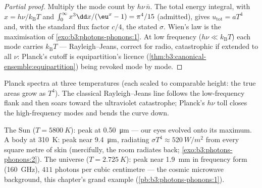 \begin{proof}[Partial proof]
Multiply the mode count by $h\nu\,\bar n$. The total energy
integral, with $x = h\nu/k_{\text{B}}T$ and $\int_0^\infty
x^3\dd x/(\eu^x - 1) = \pi^4/15$ (admitted), gives $u_{\text{tot}}
= aT^4$ and, with the standard flux factor $c/4$, the stated
$\sigma$. Wien's law is the maximisation of
\cref{exo:b3:photons-phonons:1}. At low frequency ($h\nu \ll
k_{\text{B}}T$) each mode carries $k_{\text{B}}T$ ---
Rayleigh--Jeans, correct for radio, catastrophic if extended to all
$\nu$: Planck's cutoff is equipartition's licence
(\cref{thm:b3:canonical-ensemble:equipartition}) being revoked
mode by mode.
\end{proof}

\begin{omfigure}

{\small Planck spectra at three temperatures (each scaled to
comparable height: the true areas grow as $T^4$). The classical
Rayleigh--Jeans line follows the low-frequency flank and then
soars toward the ultraviolet catastrophe; Planck's $h\nu$ toll
closes the high-frequency modes and bends the curve down.}
\end{omfigure}

\begin{example}\label{ex:b3:photons-phonons:thermometers}
The Sun ($T = \qty{5800}{K}$): peak at \qty{0.50}{\micro m} ---
our eyes evolved onto its maximum. A body at \qty{310}{K}: peak
near \qty{9.4}{\micro m}, radiating $\sigma T^4 \approx
\qty{520}{W/m^2}$ from every square metre of skin (mercifully, the
room radiates back;
\cref{exo:b3:photons-phonons:2}). The universe ($T =
\qty{2.725}{K}$): peak near \qty{1.9}{mm} in frequency form
(\qty{160}{GHz}), $411$ photons per cubic centimetre ---
the cosmic microwave background, this chapter's grand example
(\cref{pb:b3:photons-phonons:1}).
\end{example}

